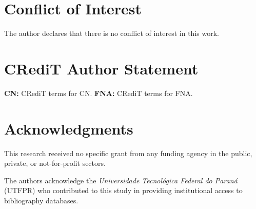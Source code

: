 
\section*{Conflict of Interest}

    The author declares that there is no conflict of interest in this work.



\section*{CRediT Author Statement}

    \textbf{CN:} CRediT terms for CN. \textbf{FNA:} CRediT terms for FNA.



\section*{Acknowledgments}

    This research received no specific grant from any funding agency in the public, private, or not-for-profit sectors.

    The authors acknowledge the \textit{Universidade Tecnológica Federal do Paraná} (UTFPR) who contributed  to  this  study  in
    providing institutional access to bibliography databases.


